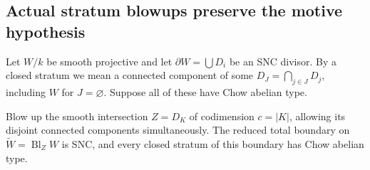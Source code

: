 \subsection{Actual stratum blowups preserve the motive hypothesis}

Let $W/k$ be smooth projective and let $\partial W=\bigcup D_i$
be an SNC divisor.  By a closed stratum we mean a connected
component of some $D_J=\bigcap_{j\in J}D_j$, including $W$
for $J=\varnothing$.  Suppose all of these have Chow abelian type.

\begin{lemma}
\label{r20at:stratumblowup}
Blow up the smooth intersection $Z=D_K$ of codimension $c=|K|$,
allowing its disjoint connected components simultaneously.  The reduced total
boundary on $\widetilde W=\operatorname{Bl}_Z W$ is SNC, and
every closed stratum of this boundary has Chow abelian type.
\end{lemma}

